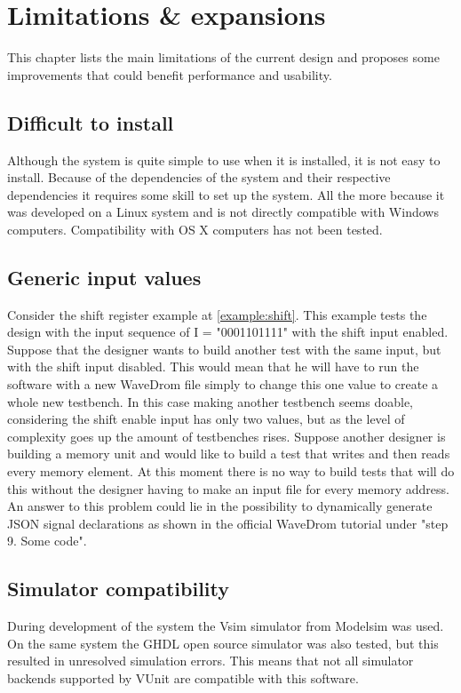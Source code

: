 \clearpage
\section{Limitations \& expansions}\label{LE}
This chapter lists the main limitations of the current design and proposes some improvements that could benefit performance and usability.
\subsection{Difficult to install}
Although the system is quite simple to use when it is installed, it is not easy to install. Because of the dependencies of the system and their respective dependencies it requires some skill to set up the system. All the more because it was developed on a Linux system and is not directly compatible with Windows computers. Compatibility with OS X computers has not been tested.
\subsection{Generic input values}
Consider the shift register example at \ref{example:shift}. This example tests the design with the input sequence of I = "0001101111" with the shift input enabled. Suppose that the designer wants to build another test with the same input, but with the shift input disabled. This would mean that he will have to run the software with a new WaveDrom file simply to change this one value to create a whole new testbench. In this case making another testbench seems doable, considering the shift enable input has only two values, but as the level of complexity goes up the amount of testbenches rises.
\npar
Suppose another designer is building a memory unit and would like to build a test that writes and then reads every memory element. At this moment there is no way to build tests that will do this without the designer having to make an input file for every memory address.
\npar
An answer to this problem could lie in the possibility to dynamically generate JSON signal declarations as shown in the official WaveDrom tutorial under "step 9. Some code".
\subsection{Simulator compatibility}
During development of the system the Vsim simulator from Modelsim was used. On the same system the GHDL open source simulator was also tested, but this resulted in unresolved simulation errors. This means that not all simulator backends supported by VUnit are compatible with this software.
